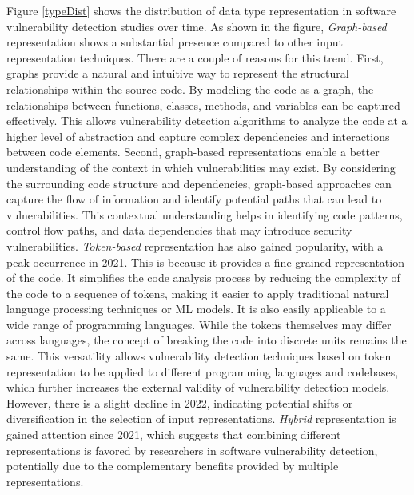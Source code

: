 Figure \ref{typeDist} shows the distribution of data type representation in software vulnerability detection studies over time. As shown in the figure, \textit{Graph-based} representation shows a substantial presence compared to other input representation techniques. There are a couple of reasons for this trend. First, graphs provide a natural and intuitive way to represent the structural relationships within the source code. By modeling the code as a graph, the relationships between functions, classes, methods, and variables can be captured effectively. This allows vulnerability detection algorithms to analyze the code at a higher level of abstraction and capture complex dependencies and interactions between code elements. Second, graph-based representations enable a better understanding of the context in which vulnerabilities may exist. By considering the surrounding code structure and dependencies, graph-based approaches can capture the flow of information and identify potential paths that can lead to vulnerabilities. This contextual understanding helps in identifying code patterns, control flow paths, and data dependencies that may introduce security vulnerabilities. \textit{Token-based} representation has also gained popularity, with a peak occurrence in 2021. This is because it provides a fine-grained representation of the code. It simplifies the code analysis process by reducing the complexity of the code to a sequence of tokens, making it easier to apply traditional natural language processing techniques or ML models. It is also easily applicable to a wide range of programming languages. While the tokens themselves may differ across languages, the concept of breaking the code into discrete units remains the same. This versatility allows vulnerability detection techniques based on token representation to be applied to different programming languages and codebases, which further increases the external validity of vulnerability detection models. However, there is a slight decline in 2022, indicating potential shifts or diversification in the selection of input representations. \textit{Hybrid} representation is gained attention since 2021, which suggests that combining different representations is favored by researchers in software vulnerability detection, potentially due to the complementary benefits provided by multiple representations.



